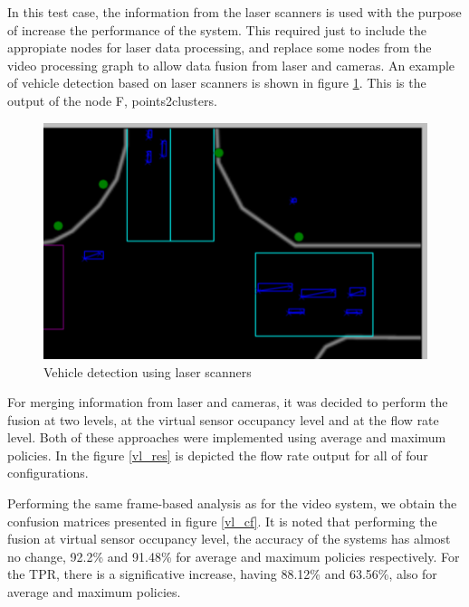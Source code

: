 
In this test case, the information from the laser scanners is used with the purpose of increase the performance of the system. This required just to include the appropiate nodes for laser data processing, and replace some nodes from the video processing graph to allow data fusion from laser and cameras. An example of vehicle detection based on laser scanners is shown in figure \ref{laser_detection}. This is the output of the node F, points2clusters.

\begin{figure}[htb!]
\centering
\includegraphics[scale=0.35]{fig/4/laser1a.png}
\caption{Vehicle detection using laser scanners}
\label{laser_detection}
\end{figure}

For merging information from laser and cameras, it was decided to perform the fusion at two levels, at the virtual sensor occupancy level and at the flow rate level. Both of these approaches were implemented using average and maximum policies. In the figure \ref{vl_res} is depicted the flow rate output for all of four configurations.

Performing the same frame-based analysis as for the video system, we obtain the confusion matrices presented in figure \ref{vl_cf}. It is noted that performing the fusion at virtual sensor occupancy level, the accuracy of the systems has almost no change, 92.2\% and 91.48\% for average and maximum policies respectively. For the TPR, there is a significative increase, having 88.12\% and 63.56\%, also for average and maximum policies.

